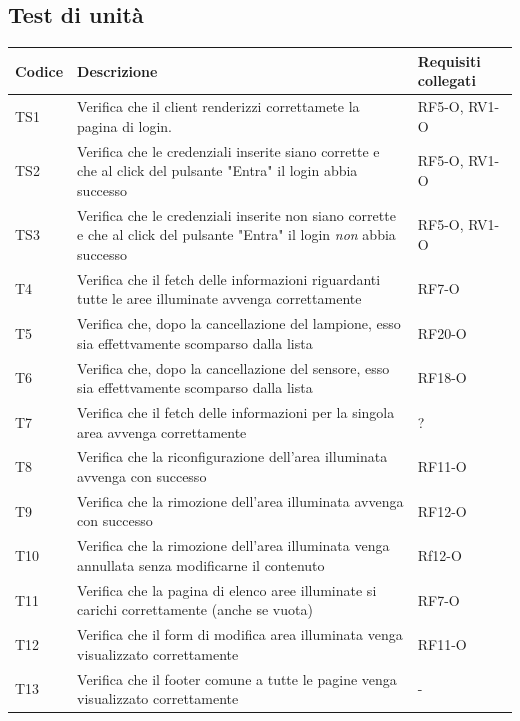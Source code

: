 \documentclass[a4paper, 12pt]{article}
\begin{document}
\subsection*{Test di unità}
\setlength\tabcolsep{4pt}
\begin{center}
	\begin{tabularx}{\textwidth}{|X|X|X|}
		\hline
		\textbf{Codice} & \textbf{Descrizione } & \textbf{Requisiti collegati } \\
		\hline
		TS1 &   Verifica che il client renderizzi correttamete la pagina di login.  &    RF5-O, RV1-O                   \\
		\hline
		TS2 &   Verifica che le credenziali inserite siano corrette e che al click del pulsante "Entra" il login abbia successo   &     RF5-O, RV1-O                   \\
		\hline
		TS3 & Verifica che le credenziali inserite non siano corrette e che al click del pulsante "Entra" il login \textit{non} abbia successo & RF5-O, RV1-O \\
		\hline
		T4 &  Verifica che il fetch delle informazioni riguardanti tutte le aree illuminate avvenga correttamente & RF7-O \\
		\hline
		T5 &  Verifica che, dopo la cancellazione del lampione, esso sia effettvamente scomparso dalla lista & RF20-O \\
		\hline
		T6 & Verifica che, dopo la cancellazione del sensore, esso sia effettvamente scomparso dalla lista & RF18-O \\
		\hline
		T7 & Verifica che il fetch delle informazioni per la singola area avvenga correttamente & ? \\
		\hline
		T8 & Verifica che la riconfigurazione dell'area illuminata avvenga con successo & RF11-O \\
		\hline
		T9 & Verifica che la rimozione dell'area illuminata avvenga con successo & RF12-O \\
		\hline
		T10 & Verifica che la rimozione dell'area illuminata venga annullata senza modificarne il contenuto & Rf12-O \\
		\hline
		T11 & Verifica che la pagina di elenco aree illuminate si carichi correttamente (anche se vuota) & RF7-O \\
		\hline
		T12 & Verifica che il form di modifica area illuminata venga visualizzato correttamente & RF11-O \\
		\hline
		T13 & Verifica che il footer comune a tutte le pagine venga visualizzato correttamente & - \\
		\hline

\end{tabularx}
\end{center}
\end{document}
